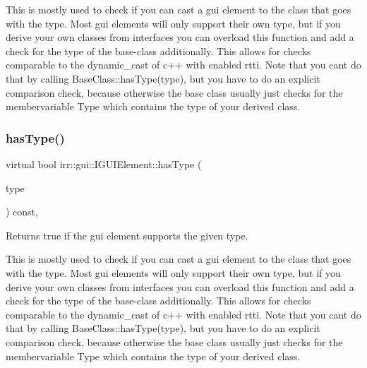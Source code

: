 This is mostly used to check if you can cast a gui element to the class that goes with the type. Most gui elements will only support their own type, but if you derive your own classes from interfaces you can overload this function and add a check for the type of the base-\/class additionally. This allows for checks comparable to the dynamic\+\_\+cast of c++ with enabled rtti. Note that you can\textquotesingle{}t do that by calling Base\+Class\+::has\+Type(type), but you have to do an explicit comparison check, because otherwise the base class usually just checks for the membervariable Type which contains the type of your derived class. \mbox{\label{classirr_1_1gui_1_1IGUIElement_a3c9f0356f89f4906c7bf5a302e57f01d}} 
\subsubsection{\texorpdfstring{has\+Type()}{hasType()}\hspace{0.1cm}{\footnotesize\ttfamily [2/2]}}
{\footnotesize\ttfamily virtual bool irr\+::gui\+::\+I\+G\+U\+I\+Element\+::has\+Type (\begin{DoxyParamCaption}\item[{\hyperlink{namespaceirr_1_1gui_ae4d66df0ecf4117cdbcf9f22404bd254}{E\+G\+U\+I\+\_\+\+E\+L\+E\+M\+E\+N\+T\+\_\+\+T\+Y\+PE}}]{type }\end{DoxyParamCaption}) const\hspace{0.3cm}{\ttfamily [inline]}, {\ttfamily [virtual]}}



Returns true if the gui element supports the given type. 

This is mostly used to check if you can cast a gui element to the class that goes with the type. Most gui elements will only support their own type, but if you derive your own classes from interfaces you can overload this function and add a check for the type of the base-\/class additionally. This allows for checks comparable to the dynamic\+\_\+cast of c++ with enabled rtti. Note that you can\textquotesingle{}t do that by calling Base\+Class\+::has\+Type(type), but you have to do an explicit comparison check, because otherwise the base class usually just checks for the membervariable Type which contains the type of your derived class. \mbox{\label{classirr_1_1gui_1_1IGUIElement_add00898b0ee96565f55b1b47efaceec6}} 
